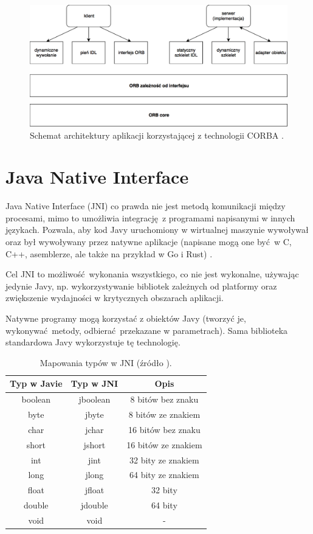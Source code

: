 \begin{figure}[h]
    \centering
    \includegraphics[width=\textwidth,height=\textheight,keepaspectratio]{img/CORBA_architecture.png}
    \caption{Schemat architektury aplikacji korzystającej z technologii CORBA \cite{Saw02}.}
    \label{fig:CORBA_architecture}
\end{figure}


\section{Java Native Interface}

Java Native Interface (JNI) co prawda nie jest metodą komunikacji między procesami, mimo to umożliwia integrację z programami napisanymi w innych językach. Pozwala, aby kod Javy uruchomiony w wirtualnej maszynie wywoływał oraz był wywoływany przez natywne aplikacje (napisane mogą one być w C, C++, asemblerze, ale także na przykład w Go i Rust) \cite{JNI17}.

Cel JNI to możliwość wykonania wszystkiego, co nie jest wykonalne, używając jedynie Javy, np. wykorzystywanie bibliotek zależnych od platformy oraz zwiększenie wydajności w krytycznych obszarach aplikacji.

Natywne programy mogą korzystać z obiektów Javy (tworzyć je, wykonywać metody, odbierać przekazane w parametrach). Sama biblioteka standardowa Javy wykorzystuje tę technologię.

\begin{table}[h!]
  \centering
  \begin{tabular}{|c|c|c|}
    \hline
    \textbf{Typ w Javie} & \textbf{Typ w JNI} & \textbf{Opis} \\ [0.5ex]
    \hline
    boolean & jboolean & 8 bitów bez znaku \\
    byte & jbyte & 8 bitów ze znakiem \\
    char & jchar & 16 bitów bez znaku \\
    short & jshort & 16 bitów ze znakiem \\
    int & jint & 32 bity ze znakiem \\
    long & jlong & 64 bity ze znakiem \\
    float & jfloat & 32 bity \\
    double & jdouble & 64 bity \\
    void & void & - \\ [1ex]
    \hline
  \end{tabular}
  \caption{Mapowania typów w JNI (źródło \cite{JNI17}).}
\end{table}


